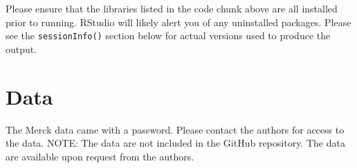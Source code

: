 \documentclass[
  letterpaper,
  DIV=11,
  numbers=noendperiod]{scrartcl}
\begin{document}
\begin{tcolorbox}[enhanced jigsaw, colbacktitle=quarto-callout-important-color!10!white, left=2mm, breakable, rightrule=.15mm, colframe=quarto-callout-important-color-frame, opacitybacktitle=0.6, titlerule=0mm, bottomrule=.15mm, toprule=.15mm, coltitle=black, toptitle=1mm, colback=white, opacityback=0, bottomtitle=1mm, title=\textcolor{quarto-callout-important-color}{\faExclamation}\hspace{0.5em}{Important}, arc=.35mm, leftrule=.75mm]

Please ensure that the libraries listed in the code chunk above are all
installed prior to running. RStudio will likely alert you of any
uninstalled packages. Please see the \texttt{sessionInfo()} section
below for actual versions used to produce the output.

\end{tcolorbox}

\section{Data}\label{data}

The Merck data came with a password. Please contact the authors for
access to the data. NOTE: The data are not included in the GitHub
repository. The data are available upon request from the authors.
\end{document}
